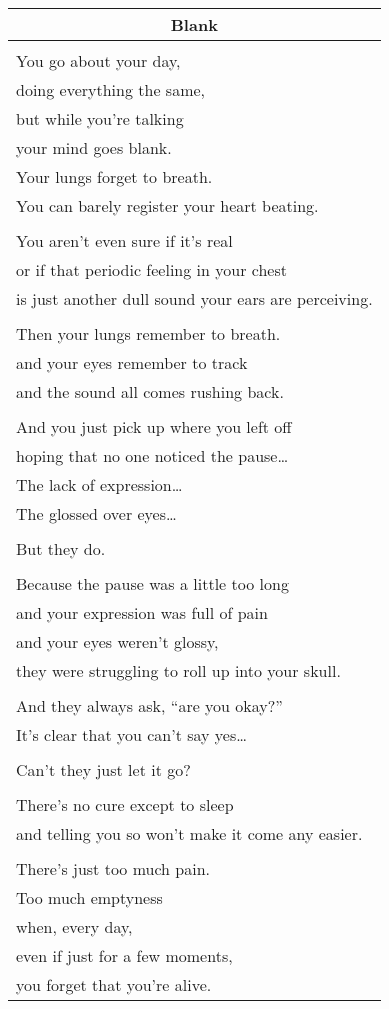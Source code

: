 \documentclass{article}
\begin{document}
\begin{center}
\begin{tabular}{l}
\multicolumn{1}{c}{\textbf{Blank}} \\ \hline
\\
You go about your day, \\
doing everything the same, \\
but while you're talking \\
your mind goes blank. \\
Your lungs forget to breath. \\
You can barely register your heart beating. \\
\\
You aren't even sure if it's real \\
or if that periodic feeling in your chest \\
is just another dull sound your ears are perceiving. \\
\\
Then your lungs remember to breath. \\
and your eyes remember to track \\
and the sound all comes rushing back. \\
\\
And you just pick up where you left off \\
hoping that no one noticed the pause\ldots{} \\
The lack of expression\ldots{} \\
The glossed over eyes\ldots{} \\
\\
But they do. \\
\\
Because the pause was a little too long \\
and your expression was full of pain \\
and your eyes weren't glossy, \\
they were struggling to roll up into your skull. \\
\\
And they always ask, ``are you okay?'' \\
It's clear that you can't say yes\ldots{} \\
\\
Can't they just let it go? \\
\\
There's no cure except to sleep \\
and telling you so won't make it come any easier. \\
\\
There's just too much pain. \\
Too much emptyness \\
when, every day, \\
even if just for a few moments, \\
you forget that you're alive. \\
\end{tabular}
\end{center}
\end{document}
